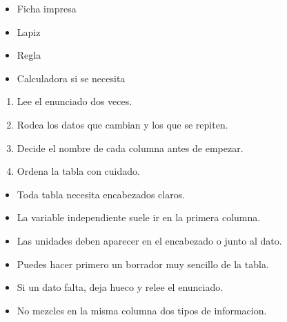 \documentclass[12pt,a4paper]{article}
\begin{document}
        \FichaCabecera

        \begin{materialesbox}
        \begin{itemize}
    \item Ficha impresa
    \item Lapiz
    \item Regla
    \item Calculadora si se necesita
\end{itemize}
        \end{materialesbox}

        \begin{pasosbox}
        \begin{enumerate}
    \item Lee el enunciado dos veces.
    \item Rodea los datos que cambian y los que se repiten.
    \item Decide el nombre de cada columna antes de empezar.
    \item Ordena la tabla con cuidado.
\end{enumerate}
        \end{pasosbox}

        \begin{recordatoriobox}
        \begin{itemize}
    \item Toda tabla necesita encabezados claros.
    \item La variable independiente suele ir en la primera columna.
    \item Las unidades deben aparecer en el encabezado o junto al dato.
\end{itemize}
        \end{recordatoriobox}

        \begin{apoyobox}
        \begin{itemize}
    \item Puedes hacer primero un borrador muy sencillo de la tabla.
    \item Si un dato falta, deja hueco y relee el enunciado.
    \item No mezcles en la misma columna dos tipos de informacion.
\end{itemize}
        \end{apoyobox}


\end{document}
